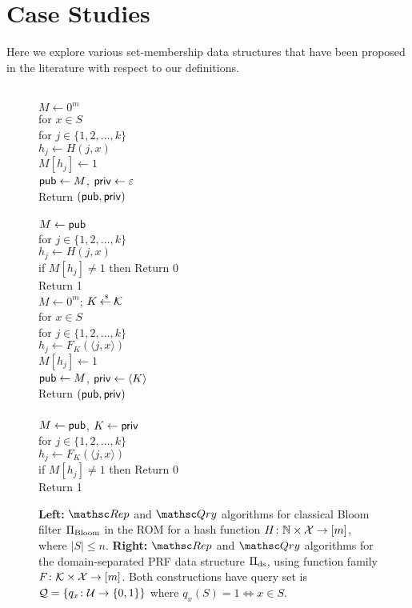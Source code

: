 \section{Case Studies}\label{sec:case_studies}
Here we explore various set-membership data structures that have been proposed
in the literature with respect to our definitions.


\begin{figure}[tp]
\centering
{}
{
\\
$M \gets 0^m$\\
for $x \in S$\\
\nudge for $j \in \{1,2,\ldots,k\}$\\
\nudge\nudge $h_j \gets H(j,x)$\\
\nudge\nudge $M[h_j] \gets 1$\\
${\sf pub} \gets M$, ${\sf priv} \gets \varepsilon$\\
Return $({\sf pub},{\sf priv})$\\

\medskip
{}\\
$M\gets{\sf pub}$\\
for $j \in \{1,2,\ldots,k\}$\\
\nudge $h_j \gets H(j,x)$\\
\nudge if $M[h_j] \neq 1$ then Return 0\\
Return 1
}
{
\\
$M \gets 0^m$; $K {\:\stackrel{{\scriptscriptstyle \hspace{0.2em}\$}} {\leftarrow}\:} {\cal K}$\\
for $x \in S$\\
\nudge for $j \in \{1,2,\ldots,k\}$\\
\nudge\nudge $h_j \gets F_{K}(\langle j,x \rangle) $\\
\nudge\nudge $M[h_j] \gets 1$\\
${\sf pub} \gets M$, ${\sf priv} \gets \langle K \rangle$\\
Return $({\sf pub},{\sf priv})$\\

\medskip
{}\\
$M\gets{\sf pub}$, $K \gets {\sf priv}$\\
for $j \in \{1,2,\ldots,k\}$\\
\nudge $h_j \gets F_{K}(\langle j,x \rangle) $\\
\nudge if $M[h_j] \neq 1$ then Return 0\\
Return 1 } \caption{{\bf Left:} $\Rep$ and $\Qry$ algorithms for
classical Bloom
  filter $\Pi_{\mathrm{Bloom}}$ in the ROM for a hash function $H\colon \mathbb{N} \times
  {\cal X} \to [m]$, where $|S| \leq n$. {\bf Right:} $\Rep$ and $\Qry$
  algorithms for the domain-separated PRF data structure
  $\Pi_{\mathrm{ds}}$, using function family $F \colon
  {\cal K} \times {\cal X} \to [m]$.  Both constructions have query set is ${\cal Q}=\{q_x\colon
  {\cal U} \to \{0,1\}\}$ where $q_x(S)=1 \Leftrightarrow x \in S$.  }
\label{fig:bf-and-ds}
\end{figure}

